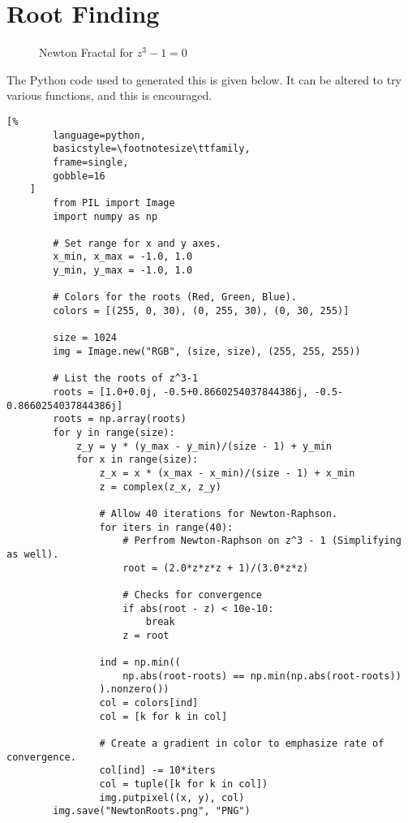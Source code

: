 \section{Root Finding}
    \begin{figure}[H]
        \centering
        \captionsetup{type=figure}
        \caption{Newton Fractal for $z^{3}-1=0$}
        \label{fig:Diff_Theory_Newton_Fractal}
    \end{figure}
    The Python code used to generated this is given below.
    It can be altered to try various functions, and this
    is encouraged.
    \newpage
    \begin{lstlisting}[%
        language=python,
        basicstyle=\footnotesize\ttfamily,
        frame=single,
        gobble=16
    ]
        from PIL import Image
        import numpy as np

        # Set range for x and y axes.
        x_min, x_max = -1.0, 1.0
        y_min, y_max = -1.0, 1.0

        # Colors for the roots (Red, Green, Blue).
        colors = [(255, 0, 30), (0, 255, 30), (0, 30, 255)]

        size = 1024
        img = Image.new("RGB", (size, size), (255, 255, 255))

        # List the roots of z^3-1
        roots = [1.0+0.0j, -0.5+0.8660254037844386j, -0.5-0.8660254037844386j]
        roots = np.array(roots)
        for y in range(size):
            z_y = y * (y_max - y_min)/(size - 1) + y_min
            for x in range(size):
                z_x = x * (x_max - x_min)/(size - 1) + x_min
                z = complex(z_x, z_y)

                # Allow 40 iterations for Newton-Raphson.
                for iters in range(40):
                    # Perfrom Newton-Raphson on z^3 - 1 (Simplifying as well).
                    root = (2.0*z*z*z + 1)/(3.0*z*z)

                    # Checks for convergence
                    if abs(root - z) < 10e-10:
                        break
                    z = root

                ind = np.min((
                    np.abs(root-roots) == np.min(np.abs(root-roots))
                ).nonzero())
                col = colors[ind]
                col = [k for k in col]

                # Create a gradient in color to emphasize rate of convergence.
                col[ind] -= 10*iters
                col = tuple([k for k in col])
                img.putpixel((x, y), col)
        img.save("NewtonRoots.png", "PNG")
    \end{lstlisting}
